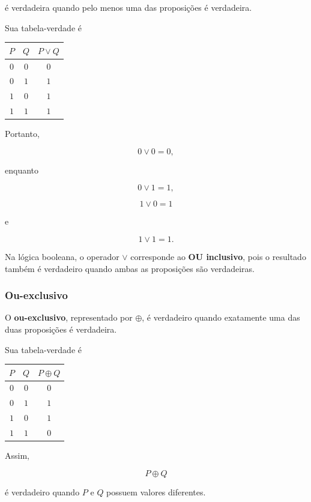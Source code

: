 \documentclass[
  brazilian,
  letterpaper,
]{book}
\theoremstyle{plain}
\theoremstyle{definition}
\theoremstyle{remark}
\begin{document}
é verdadeira quando pelo menos uma das proposições é verdadeira.

Sua tabela-verdade é

\begin{longtable*}[]{|c|c|c|}
\toprule\noalign{}
\(P\) & \(Q\) & \(P\vee Q\) \\
\midrule\noalign{}
\endhead
\bottomrule\noalign{}
\endlastfoot
\(0\) & \(0\) & \(0\) \\
\midrule
\(0\) & \(1\) & \(1\) \\
\midrule
\(1\) & \(0\) & \(1\) \\
\midrule
\(1\) & \(1\) & \(1\) \\
\end{longtable*}

Portanto,

\[
0\vee0=0,
\]

enquanto

\[
0\vee1=1,
\]

\[
1\vee0=1
\]

e

\[
1\vee1=1.
\]

Na lógica booleana, o operador \(\vee\) corresponde ao \textbf{OU
inclusivo}, pois o resultado também é verdadeiro quando ambas as
proposições são verdadeiras.

\subsubsection{Ou-exclusivo}\label{ou-exclusivo}

O \textbf{ou-exclusivo}, representado por \(\oplus\), é verdadeiro
quando exatamente uma das duas proposições é verdadeira.

Sua tabela-verdade é

\begin{longtable*}[]{|c|c|c|}
\toprule\noalign{}
\(P\) & \(Q\) & \(P\oplus Q\) \\
\midrule\noalign{}
\endhead
\bottomrule\noalign{}
\endlastfoot
\(0\) & \(0\) & \(0\) \\
\midrule
\(0\) & \(1\) & \(1\) \\
\midrule
\(1\) & \(0\) & \(1\) \\
\midrule
\(1\) & \(1\) & \(0\) \\
\end{longtable*}

Assim,

\[
P\oplus Q
\]

é verdadeiro quando \(P\) e \(Q\) possuem valores diferentes.
\end{document}
